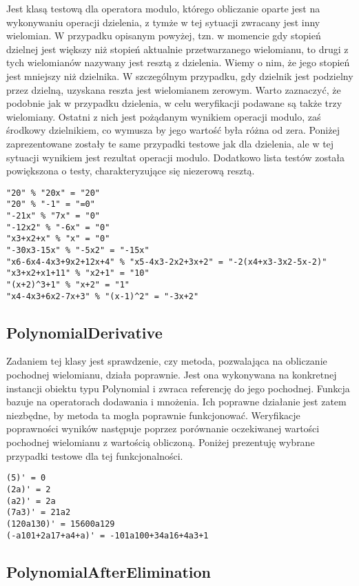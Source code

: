 \documentclass[twoside,a4paper]{book}
\begin{document}
Jest klasą testową dla operatora modulo, którego obliczanie oparte jest na wykonywaniu operacji dzielenia, z tymże w tej sytuacji zwracany jest inny wielomian. W przypadku opisanym powyżej, tzn. w momencie gdy stopień dzielnej jest większy niż stopień aktualnie przetwarzanego wielomianu, to drugi z tych wielomianów nazywany jest resztą z dzielenia. Wiemy o nim, że jego stopień jest mniejszy niż dzielnika. W szczególnym przypadku, gdy dzielnik jest podzielny przez dzielną, uzyskana reszta jest wielomianem zerowym. Warto zaznaczyć, że podobnie jak w przypadku dzielenia, w celu weryfikacji podawane są także trzy wielomiany. Ostatni z nich jest pożądanym wynikiem operacji modulo, zaś środkowy dzielnikiem, co wymusza by jego wartość była różna od zera. Poniżej zaprezentowane zostały te same przypadki testowe jak dla dzielenia, ale w tej sytuacji wynikiem jest rezultat operacji modulo. Dodatkowo lista testów została powiększona o testy, charakteryzujące się niezerową resztą.

\begin{lstlisting}
"20" % "20x" = "20"
"20" % "-1" = "=0"
"-21x" % "7x" = "0"
"-12x2" % "-6x" = "0"
"x3+x2+x" % "x" = "0"
"-30x3-15x" % "-5x2" = "-15x"
"x6-6x4-4x3+9x2+12x+4" % "x5-4x3-2x2+3x+2" = "-2(x4+x3-3x2-5x-2)"
"x3+x2+x1+11" % "x2+1" = "10"
"(x+2)^3+1" % "x+2" = "1"
"x4-4x3+6x2-7x+3" % "(x-1)^2" = "-3x+2"
\end{lstlisting}

\subsection{PolynomialDerivative}

Zadaniem tej klasy jest sprawdzenie, czy metoda, pozwalająca na obliczanie pochodnej wielomianu, działa poprawnie. Jest ona wykonywana na konkretnej instancji obiektu typu Polynomial i zwraca referencję do jego pochodnej. Funkcja bazuje na operatorach dodawania i mnożenia. Ich poprawne działanie jest zatem niezbędne, by metoda ta mogła poprawnie funkcjonować.
Weryfikacje poprawności wyników następuje poprzez porównanie oczekiwanej wartości pochodnej wielomianu z wartością obliczoną. Poniżej prezentuję wybrane przypadki testowe dla tej funkcjonalności.

\begin{lstlisting}
(5)' = 0
(2a)' = 2
(a2)' = 2a
(7a3)' = 21a2
(120a130)' = 15600a129
(-a101+2a17+a4+a)' = -101a100+34a16+4a3+1
\end{lstlisting}

\subsection{PolynomialAfterElimination}
\end{document}

